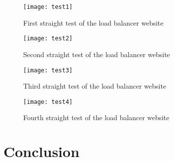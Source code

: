 \documentclass{article}
\begin{document}
\begin{figure}[H]
      \centering
      \texttt{[image: test1]}
      \caption{First straight test of the load balancer website}
      \label{load_balancer_test1}
\end{figure}
\begin{figure}[H]
      \centering
      \texttt{[image: test2]}
      \caption{Second straight test of the load balancer website}
      \label{load_balancer_test2}
\end{figure}
\begin{figure}[H]
      \centering
      \texttt{[image: test3]}
      \caption{Third straight test of the load balancer website}
      \label{load_balancer_test3}
\end{figure}
\begin{figure}[H]
      \centering
      \texttt{[image: test4]}
      \caption{Fourth straight test of the load balancer website}
      \label{load_balancer_test4}
\end{figure}

\section{Conclusion}
\end{document}
